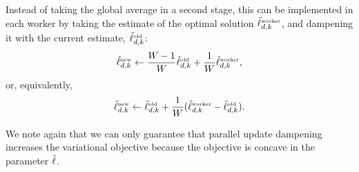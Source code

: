 Instead of taking the global average in a second stage, this can be
implemented in each worker by taking the estimate of the optimal
solution $\tilde{\ell}^{\mbox{\tiny worker}}_{d,k}$, and dampening it with
the current estimate, $\tilde{\ell}^{\mbox{\tiny old}}_{d,k}$:
 \[
  \tilde{\ell}^{\mbox{\tiny new}}_{d,k} \gets \frac{W - 1}{W} \tilde{\ell}^{\mbox{\tiny old}}_{d,k} + \frac{1}{W} \tilde{\ell}^{\mbox{\tiny worker}}_{d,k},
\]
or, equivalently,
 \[
 \tilde{\ell}^{\mbox{\tiny new}}_{d,k} \gets \tilde{\ell}^{\mbox{\tiny old}}_{d,k} + \frac{1}{W} (\tilde{\ell}^{\mbox{\tiny worker}}_{d,k} - \tilde{\ell}^{\mbox{\tiny old}}_{d,k}).
\]

We note again that we can only guarantee that parallel update
dampening increases the variational objective because the objective is
concave in the parameter $\tilde{\ell}$.
